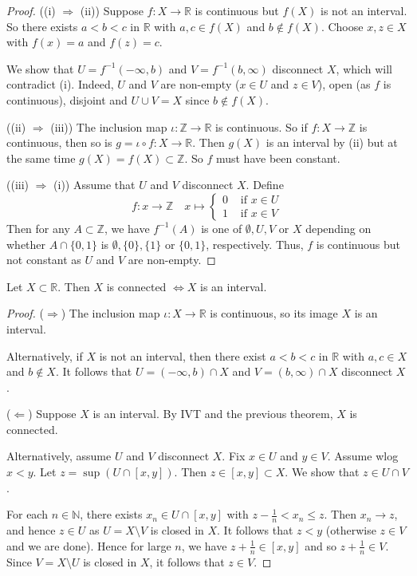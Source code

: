 \documentclass[a4paper]{article}
\begin{document}
\begin{proof}
    ((i) $ \Rightarrow$ (ii)) Suppose $f: X \rightarrow \mathbb{R}$ is continuous but $f(X)$ is not an interval. So there exists $a<b<c$ in $\mathbb{R}$ with $a, c \in f(X)$ and $b \notin f(X)$. Choose $x, z \in X$ with $f(x)=a$ and $f(z)=c$. 
    
    We show that $U=f^{-1}(-\infty, b)$ and $V=f^{-1}(b, \infty)$ disconnect $X$, which will contradict (i). Indeed, $U$ and $V$ are non-empty ($x \in U$ and $z \in V$), open (as $f$ is continuous), disjoint and $U \cup V=X$ since $b \notin f(X)$.

    ((ii) $\Rightarrow$ (iii)) The inclusion map $\iota: \mathbb{Z} \rightarrow \mathbb{R}$ is continuous. So if $f: X \rightarrow \mathbb{Z}$ is continuous, then so is $g=\iota \circ f: X \rightarrow \mathbb{R}$. Then $g(X)$ is an interval by (ii) but at the same time $g(X)=f(X) \subset \mathbb{Z}$. So $f$ must have been constant.
 
    ((iii) $\Rightarrow$ (i)) Assume that $U$ and $V$ disconnect $X$. Define
    $$
    f: x \rightarrow \mathbb{Z} \quad x \mapsto \begin{cases}0 & \text { if } x \in U \\ 1 & \text { if } x \in V\end{cases}
    $$
    Then for any $A \subset \mathbb{Z}$, we have $f^{-1}(A)$ is one of $\emptyset, U, V$ or $X$ depending on whether $A \cap\{0,1\}$ is $\emptyset,\{0\},\{1\}$ or $\{0,1\}$, respectively. Thus, $f$ is continuous but not constant as $U$ and $V$ are non-empty.
\end{proof}

\begin{corollary}
    Let $X \subset \mathbb{R}$. Then $X$ is connected $\Longleftrightarrow X$ is an interval.
\end{corollary}
\begin{proof}
    ($ \Rightarrow $) The inclusion map $\iota: X \rightarrow \mathbb{R}$ is continuous, so its image $X$ is an interval. 
    
    Alternatively, if $X$ is not an interval, then there exist $a<b<c$ in $\mathbb{R}$ with $a, c \in X$ and $b \notin X$. It follows that $U=(-\infty, b) \cap X$ and $V=(b, \infty) \cap X$ disconnect $X$.

    ($ \Leftarrow $) Suppose $X$ is an interval. By IVT and the previous theorem, $X$ is connected. 
    
    Alternatively, assume $U$ and $V$ disconnect $X$. Fix $x \in U$ and $y \in V$. Assume wlog $x<y$. Let $z=\sup (U \cap[x, y])$. Then $z \in[x, y] \subset X$. We show that $z \in U \cap V$. 
    
    For each $n \in \mathbb{N}$, there exists $x_{n} \in U \cap[x, y]$ with $z-\frac{1}{n}<x_{n} \leqslant z$. Then $x_{n} \rightarrow z$, and hence $z \in U$ as $U=X \setminus V$ is closed in $X$. It follows that $z<y$ (otherwise $z \in V$ and we are done). Hence for large $n$, we have $z+\frac{1}{n} \in[x, y]$ and so $z+\frac{1}{n} \in V$. Since $V=X \setminus U$ is closed in $X$, it follows that $z \in V$.
\end{proof}
\end{document}
